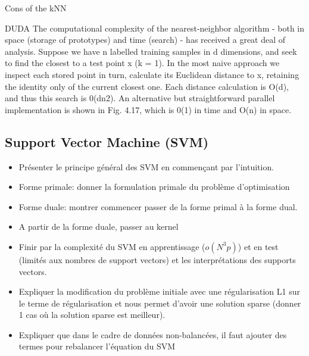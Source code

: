 Cons of the kNN


DUDA
The computational complexity of the nearest-neighbor algorithm - both in space (storage of prototypes) and time (search) - has received a great deal of analysis. Suppose we have n labelled training samples in d dimensions, and seek to find the closest to a test point x (k = 1). In the most naive approach we inspect each stored point in turn, calculate its Euclidean distance to x, retaining the identity only of the current closest one. Each distance calculation is O(d), and thus this search is 0(dn2). An alternative but straightforward parallel implementation is shown in Fig. 4.17, which is 0(1) in time and O(n) in space.


\subsection{Support Vector Machine (SVM)}
\begin{itemize}
	\item Présenter le principe général des SVM en commençant par l'intuition.
	\item Forme primale: donner la formulation primale du problème d'optimisation
	\item Forme duale: montrer commencer passer de la forme primal à la forme dual.
	\item A partir de la forme duale, passer au kernel
	\item Finir par la complexité du SVM en apprentissage ($o(N^3p)$) et en test (limités aux nombres de support vectors) et les interprétations des supports vectors.
	\item Expliquer la modification du problème initiale avec une régularisation L1 sur le terme de régularisation et nous permet d'avoir une solution sparse (donner 1 cas où la solution sparse est meilleur).
	\item Expliquer que dans le cadre de données non-balancées, il faut ajouter des termes pour rebalancer l'équation du SVM
\end{itemize}
